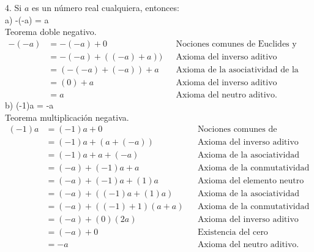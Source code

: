 \documentclass{article}
\begin{document}
4. Si \(a\) es un número real cualquiera, entonces:\\
a) \quad -(-a) = a \\
Teorema doble negativo.
\begin{align*}
-(-a) &= -(-a) + 0 && \text{Nociones comunes de Euclides y axioma del neutro aditivo} \\
&= -(-a) + ((-a) + a)) && \text{Axioma del inverso aditivo} \\
&= (-(-a) + (-a)) + a && \text{Axioma de la asociatividad de la adición} \\
&= (0) + a && \text{Axioma del inverso aditivo} \\
&= a && \text{Axioma del neutro aditivo}.
\end{align*}
b) \quad (-1)a = -a \\
Teorema multiplicación negativa.
\begin{align*}
(-1)a &= (-1)a + 0 && \text{Nociones comunes de Euclides y axioma del neutro aditivo} \\
&= (-1)a + (a + (-a)) && \text{Axioma del inverso aditivo} \\
&= (-1)a + a + (-a) && \text{Axioma de la asociatividad de la adición} \\
&= (-a) + (-1)a + a && \text{Axioma de la conmutatividad de la adición} \\
&= (-a) + (-1)a + (1)a && \text{Axioma del elemento neutro en la multiplicación} \\
&= (-a) + ((-1)a + (1)a) && \text{Axioma de la asociatividad de la adición} \\
&= (-a) + ((-1)+1)(a + a) && \text{Axioma de la conmutatividad y asociatividad de la adición} \\
&= (-a) + (0)(2a) && \text{Axioma del inverso aditivo} \\
&= (-a) + 0 && \text{Existencia del cero multiplicativo} \\
&= -a && \text{Axioma del neutro aditivo}.
\end{align*}
\end{document}

